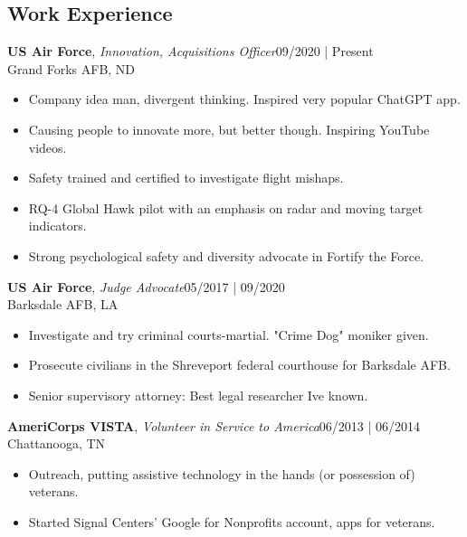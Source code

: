 \documentclass[line,margin]{res}
\begin{document}
\address{danieltuckerrust@gmail.com | 404-386-7807 | Grand Forks, ND | github.com/trustdan | linkedin.com/in/rustd}

\begin{resume}
	\vspace{-5mm}
	        
	\section{Work Experience}
	\textbf{US Air Force}, {\sl Innovation, Acquisitions Officer}\hfill 09/2020 | Present\\Grand Forks AFB, ND\\\begin{itemize} \itemsep 3pt
	\item Company idea man, divergent thinking.  Inspired very popular ChatGPT app.
	\item Causing people to innovate more, but better though.  Inspiring YouTube videos.
	\item Safety trained and certified to investigate flight mishaps.
	\item RQ-4 Global Hawk pilot with an emphasis on radar and moving target indicators.
	\item Strong psychological safety and diversity advocate in Fortify the Force.
	\end{itemize}
	\textbf{US Air Force}, {\sl Judge Advocate}\hfill 05/2017 | 09/2020\\Barksdale AFB, LA\\\begin{itemize} \itemsep 3pt
	\item Investigate and try criminal courts-martial.  "Crime Dog" moniker given.
	\item Prosecute civilians in the Shreveport federal courthouse for Barksdale AFB.
	\item Senior supervisory attorney: \textquotedbl{}Best legal researcher I\textquotesingle{}ve known.\textquotedbl{}
	\end{itemize}
	\textbf{AmeriCorps VISTA}, {\sl Volunteer in Service to America}\hfill 06/2013 | 06/2014\\Chattanooga, TN\\\begin{itemize} \itemsep 3pt
	\item Outreach, putting assistive technology in the hands (or possession of) veterans.
	\item Started Signal Centers' Google for Nonprofits account, apps for veterans.
	\end{itemize}

\end{resume}
\end{document}
